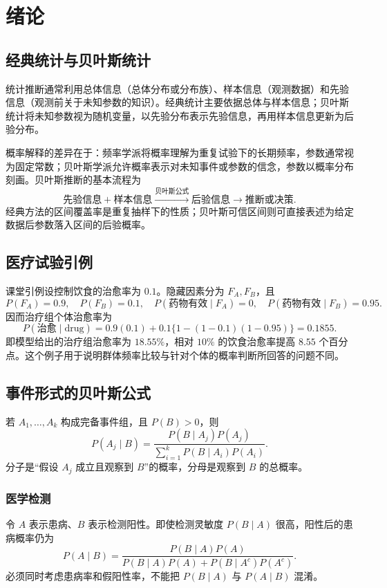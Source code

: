 \chapter*{绪论}
\section*{经典统计与贝叶斯统计}
统计推断通常利用总体信息（总体分布或分布族）、样本信息（观测数据）和先验信息（观测前关于未知参数的知识）。经典统计主要依据总体与样本信息；贝叶斯统计将未知参数视为随机变量，以先验分布表示先验信息，再用样本信息更新为后验分布。

概率解释的差异在于：频率学派将概率理解为重复试验下的长期频率，参数通常视为固定常数；贝叶斯学派允许概率表示对未知事件或参数的信念，参数以概率分布刻画。贝叶斯推断的基本流程为
\[
\text{先验信息}+\text{样本信息}\xrightarrow{\text{贝叶斯公式}}\text{后验信息}\xrightarrow{}\text{推断或决策}.
\]
经典方法的区间覆盖率是重复抽样下的性质；贝叶斯可信区间则可直接表述为给定数据后参数落入区间的后验概率。

\section*{医疗试验引例}
课堂引例设控制饮食的治愈率为 $0.1$。隐藏因素分为 $F_A,F_B$，且
\[
P(F_A)=0.9,\quad P(F_B)=0.1,\quad P(\text{药物有效}\mid F_A)=0,
\quad P(\text{药物有效}\mid F_B)=0.95.
\]
因而治疗组个体治愈率为
\[
P(\text{治愈}\mid\text{drug})=0.9(0.1)+0.1\{1-(1-0.1)(1-0.95)\}=0.1855.
\]
即模型给出的治疗组治愈率为 $18.55\%$，相对 $10\%$ 的饮食治愈率提高 $8.55$ 个百分点。这个例子用于说明群体频率比较与针对个体的概率判断所回答的问题不同。

\section*{事件形式的贝叶斯公式}
若 $A_1,\ldots,A_k$ 构成完备事件组，且 $P(B)>0$，则
\[
P(A_j\mid B)=\frac{P(B\mid A_j)P(A_j)}{\sum_{i=1}^kP(B\mid A_i)P(A_i)}.
\]
分子是“假设 $A_j$ 成立且观察到 $B$”的概率，分母是观察到 $B$ 的总概率。

\subsection*{医学检测}
令 $A$ 表示患病、$B$ 表示检测阳性。即使检测灵敏度 $P(B\mid A)$ 很高，阳性后的患病概率仍为
\[
P(A\mid B)=\frac{P(B\mid A)P(A)}{P(B\mid A)P(A)+P(B\mid A^c)P(A^c)}.
\]
必须同时考虑患病率和假阳性率，不能把 $P(B\mid A)$ 与 $P(A\mid B)$ 混淆。

